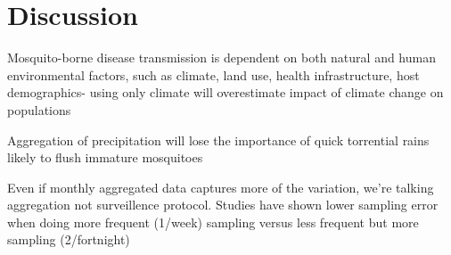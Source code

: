 \section{Discussion}

Mosquito-borne disease transmission is dependent on both natural and human environmental factors, such as climate, land use, health infrastructure, host demographics- using only climate will overestimate impact of climate change on populations \citep{Parham2015}

Aggregation of precipitation will lose the importance of quick torrential rains likely to flush immature mosquitoes \citep{Koenraadt2008}

Even if monthly aggregated data captures more of the variation, we're talking aggregation not surveillence protocol. Studies have shown lower sampling error when doing more frequent (1/week) sampling versus less frequent but more sampling (2/fortnight) \citep{MagbityLines2002}